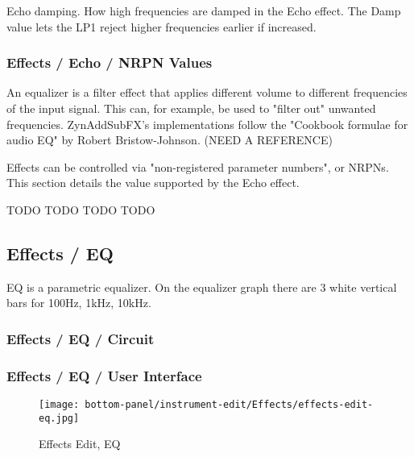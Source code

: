    Echo damping.
   How high frequencies are damped in the Echo effect.
   The Damp value lets the LP1 reject higher frequencies earlier if
   increased.

\subsubsection{Effects / Echo / NRPN Values}
\label{subsubsec:effects_edit_echo_nrpn}

   An equalizer is a filter effect that applies different volume to different
   frequencies of the input signal. This can, for example, be used to "filter
   out" unwanted frequencies. ZynAddSubFX’s implementations follow the
   "Cookbook formulae for audio EQ" by Robert Bristow-Johnson.
   (NEED A REFERENCE)

   Effects can be controlled via "non-registered parameter numbers", or NRPNs.
   This section details the value supported by the Echo effect.

   TODO
   TODO
   TODO
   TODO

\subsection{Effects / EQ}
\label{subsec:effects_edit_eq}

   EQ is a parametric equalizer. On the equalizer graph there are 3 white
   vertical bars for 100Hz, 1kHz, 10kHz.

\subsubsection{Effects / EQ / Circuit}
\label{subsubsec:effects_edit_eq_circuit}

%

\subsubsection{Effects / EQ / User Interface}
\label{subsubsec:effects_edit_eq_ui}

\begin{figure}[H]
   \centering 
   \texttt{[image: bottom-panel/instrument-edit/Effects/effects-edit-eq.jpg]}
   \caption{Effects Edit, EQ}
   \label{fig:effects_edit_eq}
\end{figure}

